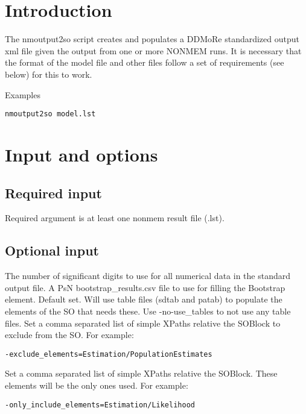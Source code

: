 



\maketitle

\section{Introduction}
The nmoutput2so script creates and populates a DDMoRe standardized output xml file given the output from one or more NONMEM runs. It is necessary that the format of the model file and other files follow a set of requirements (see below) for this to work. 


Examples
\begin{verbatim}
nmoutput2so model.lst
\end{verbatim}

\section{Input and options}

\subsection{Required input}
Required argument is at least one nonmem result file (.lst).


\subsection{Optional input}

\begin{optionlist}
The number of significant digits to use for all numerical data in the standard output file.
\nextopt
{}
A PsN bootstrap\_results.csv file to use for filling the Bootstrap element.
\nextopt
{}
Default set. Will use table files (sdtab and patab) to populate the elements of the SO that needs these. Use -no-use\_tables to not use any table files.
\nextopt
{}
Set a comma separated list of simple XPaths relative the SOBlock to exclude from the SO.
For example:
\begin{verbatim}
-exclude_elements=Estimation/PopulationEstimates
\end{verbatim}
\nextopt
{}
Set a comma separated list of simple XPaths relative the SOBlock. These elements will be the only ones used.
For example: 
\begin{verbatim}
-only_include_elements=Estimation/Likelihood
\end{verbatim}
\nextopt
\end{optionlist}


